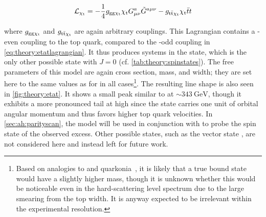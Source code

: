 \begin{equation}
  \mathcal{L}_{\mathrm{\chi_t}} = - \frac{1}{4} g_{\mathrm{gg} \mathrm{\chi_t}} \mathrm{\chi_t} G^{a}_{\mu \nu} \tilde{G}^{a \mu \nu} - g_{\mathrm{t \bar{t}} \mathrm{\chi_t}} \mathrm{\chi_t} \bar{t} t
\end{equation}

\noindent where $g_{\mathrm{gg} \mathrm{\chi_t}}$ and $g_{\mathrm{t \bar{t}} \mathrm{\chi_t}}$ are again arbitrary couplings. This Lagrangian contains a \CP-even coupling to the top quark, compared to the \CP-odd coupling in \cref{eq:theory:etatlagrangian}. It thus produces \ttbar systems in the  state, which is the only other possible state with $J = 0$ (cf. \cref{tab:theory:spinstates}). The free parameters of this model are again cross section, mass, and width; they are set here to the same values as for \etat in all cases\footnote{Based on analogies to \ccbar and \bbbar quarkonia~\cite{Barnes:2005pb}, it is likely that a true  bound state would have a slightly higher mass, though it is unknown whether this would be noticeable even in the hard-scattering level spectrum due to the large smearing from the top width. It is anyway expected to be irrelevant within the experimental resolution.}. The resulting \mWWbb line shape is also seen in \cref{fig:theory:etat}. It shows a small peak similar to \etat at $\sim \SI{343}{\GeV}$, though it exhibits a more pronounced tail at high \mWWbb since the  state carries one unit of orbital angular momentum and thus favors higher top quark velocities. In \cref{sec:ah:parityscan}, the \chit model will be used in conjunction with \etat to probe the spin state of the observed excess. Other possible states, such as the vector state , are not considered here and instead left for future work.






